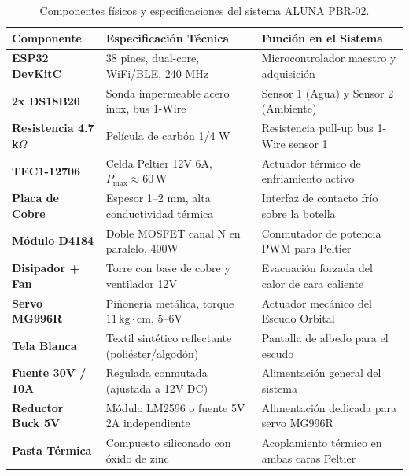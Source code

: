 \documentclass[11pt,letterpaper]{article}
\begin{document}
\begin{table}[h!]
\centering
\caption{Componentes físicos y especificaciones del sistema ALUNA PBR-02.}
\label{tab:bom}
\begin{tabularx}{\textwidth}{@{}l L L@{}}
\toprule
\textbf{Componente} & \textbf{Especificación Técnica} & \textbf{Función en el Sistema} \\
\midrule
\textbf{ESP32 DevKitC} & 38 pines, dual-core, WiFi/BLE, 240 MHz & Microcontrolador maestro y adquisición \\
\textbf{2x DS18B20} & Sonda impermeable acero inox, bus 1-Wire & Sensor 1 (Agua) y Sensor 2 (Ambiente) \\
\textbf{Resistencia 4.7 k$\Omega$} & Película de carbón 1/4 W & Resistencia pull-up bus 1-Wire sensor 1 \\
\textbf{TEC1-12706} & Celda Peltier 12V 6A, $P_{\max} \approx 60\,\text{W}$ & Actuador térmico de enfriamiento activo \\
\textbf{Placa de Cobre} & Espesor 1--2 mm, alta conductividad térmica & Interfaz de contacto frío sobre la botella \\
\textbf{Módulo D4184} & Doble MOSFET canal N en paralelo, 400W & Conmutador de potencia PWM para Peltier \\
\textbf{Disipador + Fan} & Torre con base de cobre y ventilador 12V & Evacuación forzada del calor de cara caliente \\
\textbf{Servo MG996R} & Piñonería metálica, torque $11\,\text{kg}\cdot\text{cm}$, 5--6V & Actuador mecánico del Escudo Orbital \\
\textbf{Tela Blanca} & Textil sintético reflectante (poliéster/algodón) & Pantalla de albedo para el escudo \\
\textbf{Fuente 30V / 10A} & Regulada conmutada (ajustada a 12V DC) & Alimentación general del sistema \\
\textbf{Reductor Buck 5V} & Módulo LM2596 o fuente 5V 2A independiente & Alimentación dedicada para servo MG996R \\
\textbf{Pasta Térmica} & Compuesto siliconado con óxido de zinc & Acoplamiento térmico en ambas caras Peltier \\
\bottomrule
\end{tabularx}
\end{table}

\end{document}

